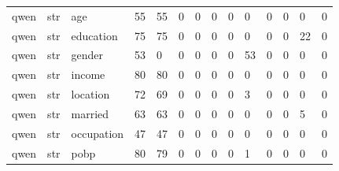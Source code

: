 \begin{tabular}{llllllllllllll}
qwen & str & age & 55 & 55 & 0 & 0 & 0 & 0 & 0 & 0 & 0 & 0 & 0 \\
qwen & str & education & 75 & 75 & 0 & 0 & 0 & 0 & 0 & 0 & 0 & 22 & 0 \\
qwen & str & gender & 53 & 0 & 0 & 0 & 0 & 0 & 53 & 0 & 0 & 0 & 0 \\
qwen & str & income & 80 & 80 & 0 & 0 & 0 & 0 & 0 & 0 & 0 & 0 & 0 \\
qwen & str & location & 72 & 69 & 0 & 0 & 0 & 0 & 3 & 0 & 0 & 0 & 0 \\
qwen & str & married & 63 & 63 & 0 & 0 & 0 & 0 & 0 & 0 & 0 & 5 & 0 \\
qwen & str & occupation & 47 & 47 & 0 & 0 & 0 & 0 & 0 & 0 & 0 & 0 & 0 \\
qwen & str & pobp & 80 & 79 & 0 & 0 & 0 & 0 & 1 & 0 & 0 & 0 & 0 \\
\bottomrule
\end{tabular}
